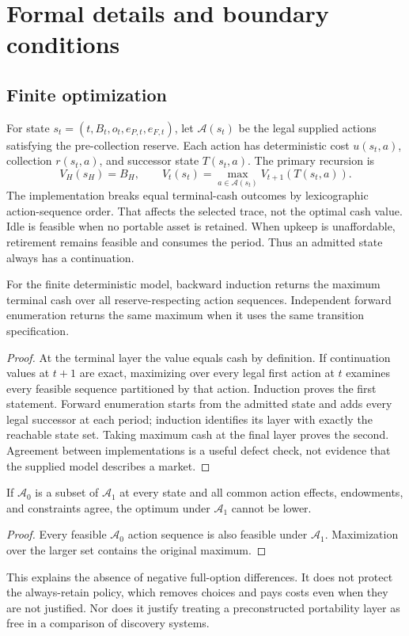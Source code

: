 \clearpage
\appendix
\section{Formal details and boundary conditions}
\label{app:formal}
\subsection{Finite optimization}
For state $s_t=(t,B_t,o_t,e_{P,t},e_{F,t})$, let $\mathcal A(s_t)$ be the legal supplied actions satisfying the pre-collection reserve. Each action has deterministic cost $u(s_t,a)$, collection $r(s_t,a)$, and successor state $T(s_t,a)$. The primary recursion is
\begin{equation}
 V_H(s_H)=B_H,\qquad V_t(s_t)=\max_{a\in\mathcal A(s_t)}V_{t+1}(T(s_t,a)).
\end{equation}
The implementation breaks equal terminal-cash outcomes by lexicographic action-sequence order. That affects the selected trace, not the optimal cash value. Idle is feasible when no portable asset is retained. When upkeep is unaffordable, retirement remains feasible and consumes the period. Thus an admitted state always has a continuation.

\begin{proposition}
For the finite deterministic model, backward induction returns the maximum terminal cash over all reserve-respecting action sequences. Independent forward enumeration returns the same maximum when it uses the same transition specification.
\end{proposition}
\begin{proof}
At the terminal layer the value equals cash by definition. If continuation values at $t+1$ are exact, maximizing over every legal first action at $t$ examines every feasible sequence partitioned by that action. Induction proves the first statement. Forward enumeration starts from the admitted state and adds every legal successor at each period; induction identifies its layer with exactly the reachable state set. Taking maximum cash at the final layer proves the second. Agreement between implementations is a useful defect check, not evidence that the supplied model describes a market.
\end{proof}

\begin{corollary}
If $\mathcal A_0$ is a subset of $\mathcal A_1$ at every state and all common action effects, endowments, and constraints agree, the optimum under $\mathcal A_1$ cannot be lower.
\end{corollary}
\begin{proof}
Every feasible $\mathcal A_0$ action sequence is also feasible under $\mathcal A_1$. Maximization over the larger set contains the original maximum.
\end{proof}
This explains the absence of negative full-option differences. It does not protect the always-retain policy, which removes choices and pays costs even when they are not justified. Nor does it justify treating a preconstructed portability layer as free in a comparison of discovery systems.


